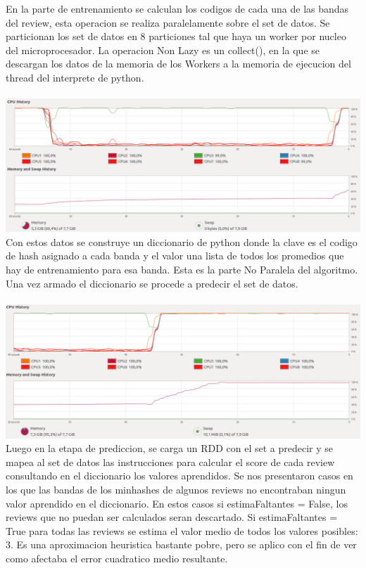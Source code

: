 \documentclass[a4paper,10pt]{article}
\begin{document}
	En la parte de entrenamiento se calculan los codigos de cada una de las bandas del review, esta operacion se realiza paralelamente sobre el set de datos. Se particionan los set de datos en 8 particiones tal que haya un worker por nucleo del microprocesador. La operacion Non Lazy es un collect(), en la que se descargan los datos de la memoria de los Workers a la memoria de ejecucion del thread del interprete de python. \\ \\ \includegraphics[width=\textwidth]{timeline1} \\ Con estos datos se construye un diccionario de python donde la clave es el codigo de hash asignado a cada banda y el valor una lista de todos los promedios que hay de entrenamiento para esa banda. Esta es la parte No Paralela del algoritmo. Una vez armado el diccionario se procede a predecir el set de datos. \\ \\ \includegraphics[width=\textwidth]{timeline2} \\ Luego en la etapa de prediccion, se carga un RDD con el set a predecir y se mapea al set de datos las instrucciones para calcular el score de cada review consultando en el diccionario los valores aprendidos. Se nos presentaron casos en los que las bandas de los minhashes de algunos reviews no encontraban ningun valor aprendido en el diccionario. En estos casos si estimaFaltantes = False, los reviews que no puedan ser calculados seran descartado. Si estimaFaltantes = True para todas las reviews se estima el valor medio de todos los valores posibles: 3. Es una aproximacion heuristica bastante pobre, pero se aplico con el fin de ver como afectaba el error cuadratico medio resultante.  \\ \\ 
\end{document}
